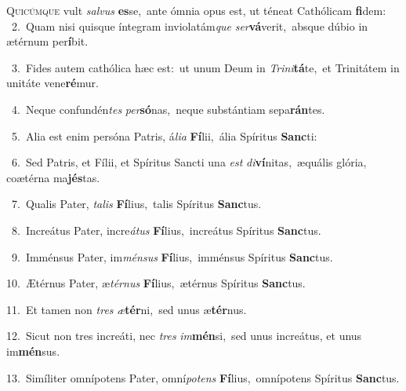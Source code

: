 \lettrine{\initial\textcolor{\initialcolor}{Q}}{uicúmque} vult \textit{sal}\-\textit{vus} \textbf{es}\-se,~\star ante ómnia opus est, ut téneat Cathólicam \textbf{fi}\-dem:\\
{\numbfont\textcolor{\numbcolor}{~2.}}~Quam nisi quisque íntegram inviolatám\textit{que} \textit{ser}\-\textbf{vá}verit,~\star absque dúbio in ætérnum per\-\textbf{í}\-bit.\par
{\numbfont\textcolor{\numbcolor}{~3.}}~Fides autem cathólica hæc est:~\dagger ut unum Deum in \textit{Tri}\-\textit{ni}\textbf{tá}te,~\star et Trinitátem in unitáte vene\-\textbf{ré}\-mur.\par
{\numbfont\textcolor{\numbcolor}{~4.}}~Neque confundén\textit{tes} \textit{per}\-\textbf{só}nas,~\star neque substántiam sepa\-\textbf{rán}\-tes.\par
{\numbfont\textcolor{\numbcolor}{~5.}}~Alia est enim persóna Patris, á\-\textit{li}\-\textit{a} \textbf{Fí}\-lii,~\star ália Spíritus \textbf{Sanc}\-ti:\par
{\numbfont\textcolor{\numbcolor}{~6.}}~Sed Patris, et Fílii, et Spíritus Sancti una \textit{est} \textit{di}\-\textbf{ví}nitas,~\star æquális glória, coætérna ma\-\textbf{jés}\-tas.\par
{\numbfont\textcolor{\numbcolor}{~7.}}~Qualis Pater, \textit{ta}\-\textit{lis} \textbf{Fí}\-lius,~\star talis Spíritus \textbf{Sanc}\-tus.\par
{\numbfont\textcolor{\numbcolor}{~8.}}~Increátus Pater, incre\-\textit{á}\-\textit{tus} \textbf{Fí}\-lius,~\star increátus Spíritus \textbf{Sanc}\-tus.\par
{\numbfont\textcolor{\numbcolor}{~9.}}~Imménsus Pater, im\-\textit{mén}\-\textit{sus} \textbf{Fí}\-lius,~\star imménsus Spíritus \textbf{Sanc}\-tus.\par
{\numbfont\textcolor{\numbcolor}{10.}}~Ætérnus Pater, æ\-\textit{tér}\-\textit{nus} \textbf{Fí}\-lius,~\star ætérnus Spíritus \textbf{Sanc}\-tus.\par
{\numbfont\textcolor{\numbcolor}{11.}}~Et tamen non \textit{tres} \textit{æ}\-\textbf{tér}ni,~\star sed unus æ\-\textbf{tér}\-nus.\par
{\numbfont\textcolor{\numbcolor}{12.}}~Sicut non tres increáti, nec \textit{tres} \textit{im}\-\textbf{mén}si,~\star sed unus increátus, et unus im\-\textbf{mén}\-sus.\par
{\numbfont\textcolor{\numbcolor}{13.}}~Simíliter omnípotens Pater, omní\-\textit{pot}\-\textit{ens} \textbf{Fí}\-lius,~\star omnípotens Spíritus \textbf{Sanc}\-tus.\par
